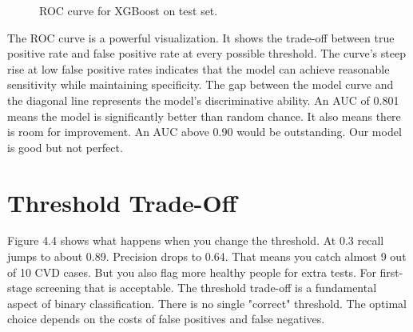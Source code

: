 \documentclass[12pt, a4paper, oneside]{book}
\begin{document}
\begin{figure}[H]
\vspace{12pt}
\caption{ROC curve for XGBoost on test set.}
\label{fig:roc_xgboost}
\end{figure}

The ROC curve is a powerful visualization. It shows the trade-off between true positive rate and false positive rate at every possible threshold. The curve's steep rise at low false positive rates indicates that the model can achieve reasonable sensitivity while maintaining specificity. The gap between the model curve and the diagonal line represents the model's discriminative ability. An AUC of 0.801 means the model is significantly better than random chance. It also means there is room for improvement. An AUC above 0.90 would be outstanding. Our model is good but not perfect.

\section{Threshold Trade-Off}
Figure 4.4 shows what happens when you change the threshold. At 0.3 recall jumps to about 0.89. Precision drops to 0.64. That means you catch almost 9 out of 10 CVD cases. But you also flag more healthy people for extra tests. For first-stage screening that is acceptable. The threshold trade-off is a fundamental aspect of binary classification. There is no single "correct" threshold. The optimal choice depends on the costs of false positives and false negatives.
\end{document}
